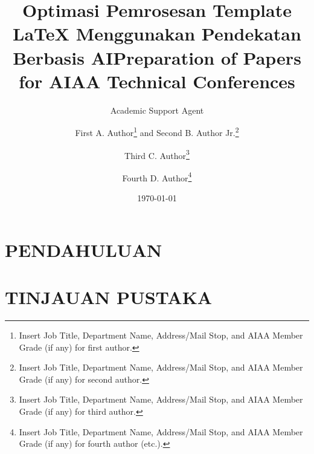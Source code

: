 \documentclass{new-aiaa}
\title{Optimasi Pemrosesan Template LaTeX Menggunakan Pendekatan Berbasis AI}
\author{Academic Support Agent}
\date{\today}
\begin{document}
\maketitle

\begin{abstract}

\end{abstract}

\chapter{PENDAHULUAN}


\chapter{TINJAUAN PUSTAKA}


\usepackage[utf8]{inputenc}

\usepackage{graphicx}
\usepackage{amsmath}
\usepackage[version=4]{mhchem}
\usepackage{siunitx}
\usepackage{longtable,tabularx}
\setlength\LTleft{0pt} 

\title{Preparation of Papers for AIAA Technical Conferences}

\author{First A. Author\footnote{Insert Job Title, Department Name, Address/Mail Stop, and AIAA Member Grade (if any) for first author.} and Second B. Author Jr.\footnote{Insert Job Title, Department Name, Address/Mail Stop, and AIAA Member Grade (if any) for second author.}}
\author{Third C. Author\footnote{Insert Job Title, Department Name, Address/Mail Stop, and AIAA Member Grade (if any) for third author.}}
\author{Fourth D. Author\footnote{Insert Job Title, Department Name, Address/Mail Stop, and AIAA Member Grade (if any) for fourth author (etc.).}}
\end{document}
